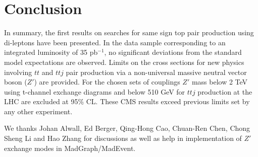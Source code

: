 \section{Conclusion}
\label{sec:conclusion}
In summary, the first results on searches for same sign top pair production using di-leptons have
been presented. In the data sample corresponding to an integrated luminosity of 35 pb$^{-1}$, no significant
deviations from the standard model expectations are observed. Limits on the cross sections for new physics
involving $tt$ and $ttj$  pair production via a non-universal massive neutral vector boson ($Z'$) are provided. 
For the chosen sets of couplings $Z'$ mass below 2 TeV using t-channel exchange diagrams and below 510 GeV 
for $ttj$ production at the LHC are excluded at 95\% CL. These CMS results exceed previous limits set by any 
other experiment.

\ack

We thanks Johan Alwall, Ed Berger, Qing-Hong Cao, Chuan-Ren Chen, Chong Sheng Li and Hao Zhang for 
discussions as well as help in implementation of $Z'$ exchange modes in MadGraph/MadEvent. 


